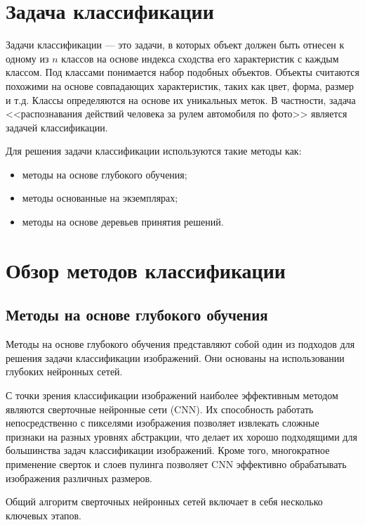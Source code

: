 \section{Задача классификации}
Задачи классификации --- это задачи, в которых объект должен быть отнесен к одному из $n$ классов на основе индекса сходства его характеристик с каждым классом. Под классами понимается набор подобных объектов. Объекты считаются похожими на основе совпадающих характеристик, таких как цвет, форма, размер и т.д. Классы определяются на основе их уникальных меток. В частности, задача  <<распознавания действий человека за рулем автомобиля по фото>>  является задачей классификации.

Для решения задачи классификации используются такие методы как:

\begin{itemize}[leftmargin=1.6\parindent, label*=---]
	\item методы на основе глубокого обучения;
	\item методы основанные на экземплярах;
	\item методы на основе деревьев принятия решений.
\end{itemize}

\section{Обзор методов классификации}

\subsection{Методы на основе глубокого обучения}

Методы на основе глубокого обучения представляют собой один из подходов для решения задачи классификации изображений. Они основаны на использовании глубоких нейронных сетей.

С точки зрения классификации изображений наиболее эффективным методом являются сверточные нейронные сети (CNN)\cite{cnn}. Их способность работать непосредственно с пикселями изображения позволяет извлекать сложные признаки на разных уровнях абстракции, что делает их хорошо подходящими для большинства задач классификации изображений. Кроме того, многократное применение сверток и слоев пулинга позволяет CNN эффективно обрабатывать изображения различных размеров.
\newpage

Общий алгоритм сверточных нейронных сетей включает в себя несколько ключевых этапов.


